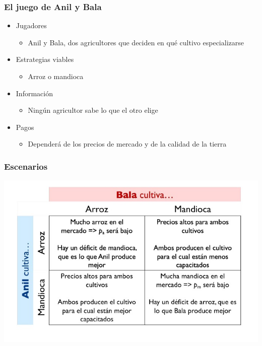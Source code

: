 \documentclass{beamer}
\begin{document}
\begin{frame}
\frametitle{El juego de Anil y Bala}
\begin{itemize}
    \item Jugadores
        \begin{itemize}
        \item Anil y Bala, dos agricultores que deciden en qué cultivo especializarse
        \end{itemize}
    \item Estrategias viables
        \begin{itemize}
        \item Arroz o mandioca
        \end{itemize}
    \item Información
        \begin{itemize}
        \item Ningún agricultor sabe lo que el otro elige
        \end{itemize}
    \item Pagos
        \begin{itemize}
        \item Dependerá de los precios de mercado y de la calidad de la tierra
        \end{itemize}
\end{itemize}
\end{frame}

\begin{frame}
\frametitle{ Escenarios}
\centering
\includegraphics[scale=0.65]{Slides Principios de Economia/Figures/Tema_03_7_bala.jpg}
\end{frame}
\end{document}
